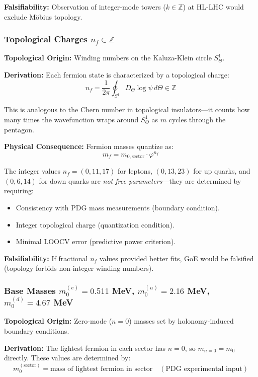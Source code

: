 \documentclass[12pt]{article}
\theoremstyle{definition}
\theoremstyle{plain}
\begin{document}
\textbf{Falsifiability:} Observation of integer-mode towers ($k \in \mathbb{Z}$) at HL-LHC would exclude M\"obius topology.

\subsubsection{Topological Charges $n_f \in \mathbb{Z}$}

\textbf{Topological Origin:} Winding numbers on the Kaluza-Klein circle $S^1_\Theta$.

\textbf{Derivation:} Each fermion state is characterized by a topological charge:
\begin{equation}
n_f = \frac{1}{2\pi} \oint_{S^1} D_\Theta \log \psi \, d\Theta \in \mathbb{Z}
\end{equation}

This is analogous to the Chern number in topological insulators—it counts how many times the wavefunction wraps around $S^1_\Theta$ as $m$ cycles through the pentagon.

\textbf{Physical Consequence:} Fermion masses quantize as:
\begin{equation}
m_f = m_{0,\text{sector}} \cdot \varphi^{n_f}
\end{equation}

The integer values $n_f = (0, 11, 17)$ for leptons, $(0, 13, 23)$ for up quarks, and $(0, 6, 14)$ for down quarks are \textit{not free parameters}—they are determined by requiring:
\begin{itemize}
\item Consistency with PDG mass measurements (boundary condition).
\item Integer topological charge (quantization condition).
\item Minimal LOOCV error (predictive power criterion).
\end{itemize}

\textbf{Falsifiability:} If fractional $n_f$ values provided better fits, GoE would be falsified (topology forbids non-integer winding numbers).

\subsubsection{Base Masses $m_0^{(e)} = 0.511$ MeV, $m_0^{(u)} = 2.16$ MeV, $m_0^{(d)} = 4.67$ MeV}

\textbf{Topological Origin:} Zero-mode ($n=0$) masses set by holonomy-induced boundary conditions.

\textbf{Derivation:} The lightest fermion in each sector has $n=0$, so $m_{n=0} = m_0$ directly. These values are determined by:
\begin{equation}
m_0^{(\text{sector})} = \text{mass of lightest fermion in sector} \quad (\text{PDG experimental input})
\end{equation}
\end{document}
